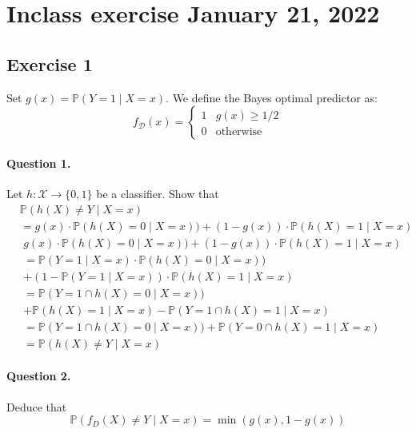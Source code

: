\documentclass{article}
\newcommand{\1}{\mathbf{1}}
\renewcommand{\P}{\mathbb{P}}
\begin{document}
\section{Inclass exercise January 21, 2022}
\subsection{Exercise 1}
Set \(g(x) = \P(Y=1 \mid X=x)\). We define the Bayes optimal predictor as:
\begin{equation*}
  f_\mathcal{D}(x) =
  \begin{cases}
    1 & g(x) \geq 1/2    \\
    0 & \text{otherwise}
  \end{cases}
\end{equation*}

\paragraph{Question 1.}
Let \(h: \mathcal{X} \to \{0,1\}\) be a classifier. Show that
\begin{align*}
   & \P(h(X) \neq Y \mid X = x )                                                      \\
   & = g(x) \cdot \P(h(X) = 0 \mid X = x)) + (1 - g(x)) \cdot \P(h(X) = 1 \mid X = x)
\end{align*}
\begin{align*}
   & g(x) \cdot \P(h(X) = 0 \mid X = x)) + (1 - g(x)) \cdot \P(h(X) = 1 \mid X = x) \\
   & = \P(Y=1 \mid X = x) \cdot \P(h(X) = 0 \mid X = x))                            \\
   & + (1 - \P(Y=1 \mid X = x)) \cdot \P(h(X) = 1 \mid X = x)                       \\
   & = \P(Y=1 \cap h(X) = 0 \mid X = x))                                            \\
   & + \P(h(X) = 1 \mid X = x) - \P(Y=1 \cap h(X) = 1 \mid X = x)                   \\
   & = \P(Y=1 \cap h(X) = 0 \mid X = x)) + \P(Y=0 \cap h(X) = 1 \mid X = x)         \\
   & =\P(h(X) \neq Y \mid X = x)
\end{align*}

\paragraph{Question 2.}
Deduce that
\[
  \P(f_D (X) \neq Y \mid X = x) = \min (g(x), 1 - g(x))
\]
\end{document}
